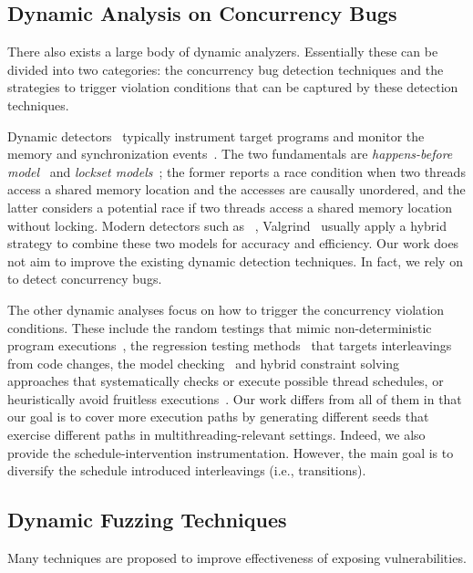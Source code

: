 \subsection{Dynamic Analysis on Concurrency Bugs}
There also exists a large body of dynamic analyzers.
Essentially these can be divided into two categories: the concurrency bug detection techniques and the strategies to trigger violation conditions that can be captured by these detection techniques.


Dynamic detectors~\cite{pldi09_fasttrack,lockset_SavageABNS97,kcc:tsan,JinTLL10,YuNPP12} typically instrument target programs and monitor the memory and synchronization events~\cite{mtbugs_survey}. The two fundamentals are \emph{happens-before model}~\cite{pldi09_fasttrack} and \emph{lockset models}~\cite{lockset_SavageABNS97}; the former reports a race condition when two threads access a shared memory location and the accesses are
causally unordered, and the latter considers a potential race if two threads access a shared memory location without locking. Modern detectors such as \ts~\cite{kcc:tsan}, Valgrind~\cite{helgrind} usually apply a hybrid strategy to combine these two models for accuracy and efficiency. Our work does not aim to improve the existing dynamic detection techniques. In fact, we rely on \ts to detect concurrency bugs.


The other dynamic analyses focus on how to trigger the concurrency violation conditions. These include the random testings that mimic non-deterministic program executions~\cite{Sen07,Sen08,JoshiPSN09,ParkS08,CaiC12}, the regression testing methods~\cite{TerragniCZ15,YuHW18} that targets interleavings from code changes, the model checking~\cite{FlanaganG05,ZaksJ08,YangCGK07,yang2008inspect} and hybrid constraint solving~\cite{pldi14_maxmodel,Huang15,icse18_ufo} approaches that systematically checks or execute possible thread schedules, or heuristically avoid fruitless executions~\cite{GuoKWYG15,GuoKW16}. Our work differs from all of them in that our goal is to cover more execution paths by generating different seeds that exercise different paths in multithreading-relevant settings. Indeed, we also provide the schedule-intervention instrumentation. However, the main goal is to diversify the schedule introduced interleavings (i.e., transitions).

\subsection{Dynamic Fuzzing Techniques}
Many techniques are proposed to improve effectiveness of exposing vulnerabilities.

